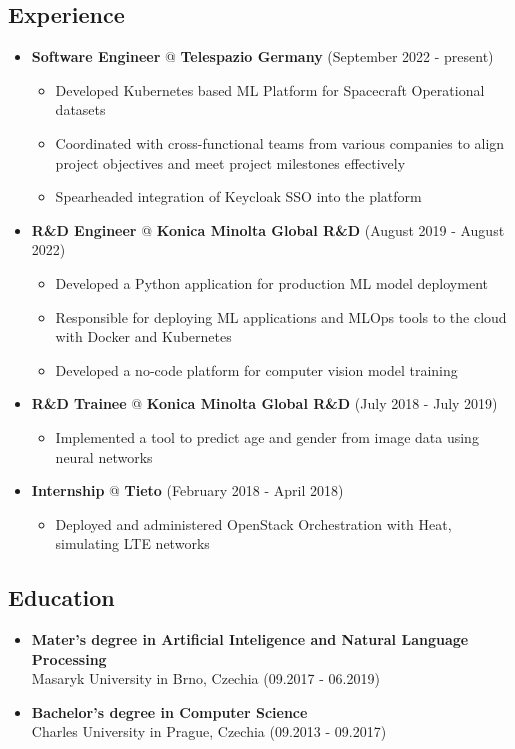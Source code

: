 \documentclass[a4paper,12pt]{article}
\begin{document}
{\color{myblue}
\subsection*{Experience}\label{work}
}
\begin{itemize}
\item
  \textbf{Software Engineer} @ \textbf{Telespazio Germany} \hfill (September 2022 - present)
  \begin{itemize}
      \item Developed Kubernetes based ML Platform for Spacecraft Operational datasets
      \item Coordinated with cross-functional teams from various companies to align project objectives and meet project milestones effectively
      \item Spearheaded integration of Keycloak SSO into the platform
  \end{itemize}
\item
  \textbf{R\&D Engineer} @ \textbf{Konica Minolta Global R\&D} \hfill (August 2019 - August 2022)
  \begin{itemize}
      \item Developed a Python application for production ML model deployment
      \item Responsible for deploying ML applications and MLOps tools to the cloud with Docker and Kubernetes
      \item Developed a no-code platform for computer vision model training
  \end{itemize}
\item
  \textbf{R\&D Trainee} @ \textbf{Konica Minolta Global R\&D} \hfill (July 2018 - July 2019)
  \begin{itemize}
      \item Implemented a tool to predict age and gender from image data using neural networks
  \end{itemize}
\item
  \textbf{Internship} @ \textbf{Tieto} \hfill (February 2018 - April 2018)
  \begin{itemize}
      \item Deployed and administered OpenStack Orchestration with Heat, simulating LTE networks
  \end{itemize}
\end{itemize}

{\color{myblue}
\subsection*{Education}\label{education}
}
\begin{itemize}
\item
  \textbf{Mater's degree in Artificial Inteligence and Natural Language Processing}\\
  Masaryk University in Brno, Czechia \hfill (09.2017 - 06.2019)
\item
  \textbf{Bachelor's degree in Computer Science}\\
  Charles University in Prague, Czechia \hfill (09.2013 - 09.2017)
\end{itemize}
\end{document}

